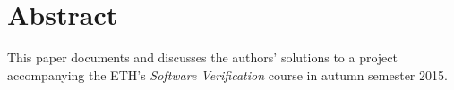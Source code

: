 \section*{Abstract}
This paper documents and discusses the authors' solutions to a project accompanying the ETH's \emph{Software Verification} course in autumn semester 2015.